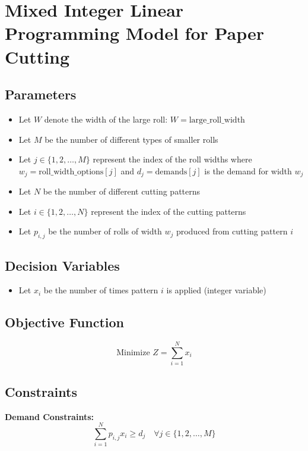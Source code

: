 \documentclass{article}
\begin{document}
\section*{Mixed Integer Linear Programming Model for Paper Cutting}

\subsection*{Parameters}
\begin{itemize}
    \item Let $W$ denote the width of the large roll: $W = \text{large\_roll\_width}$
    \item Let $M$ be the number of different types of smaller rolls
    \item Let $j \in \{1, 2, \ldots, M\}$ represent the index of the roll widths where $w_j = \text{roll\_width\_options}[j]$ and $d_j = \text{demands}[j]$ is the demand for width $w_j$
    \item Let $N$ be the number of different cutting patterns
    \item Let $i \in \{1, 2, \ldots, N\}$ represent the index of the cutting patterns
    \item Let $p_{i,j}$ be the number of rolls of width $w_j$ produced from cutting pattern $i$
\end{itemize}

\subsection*{Decision Variables}
\begin{itemize}
    \item Let $x_i$ be the number of times pattern $i$ is applied (integer variable)
\end{itemize}

\subsection*{Objective Function}
\begin{equation}
\text{Minimize } Z = \sum_{i=1}^{N} x_i
\end{equation}

\subsection*{Constraints}

\textbf{Demand Constraints:}
\begin{equation}
\sum_{i=1}^{N} p_{i,j} x_i \geq d_j \quad \forall j \in \{1, 2, \ldots, M\}
\end{equation}
\end{document}
